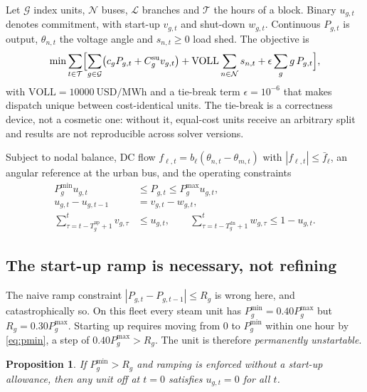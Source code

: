 \documentclass[11pt,a4paper]{article}
\theoremstyle{definition}
\theoremstyle{plain}
\newtheorem{proposition}[definition]{Proposition}
\theoremstyle{remark}
\newcommand{\VOLL}{\mathrm{VOLL}}
\begin{document}
Let $\mathcal{G}$ index units, $\mathcal{N}$ buses, $\mathcal{L}$ branches and
$\mathcal{T}$ the hours of a block. Binary $u_{g,t}$ denotes commitment, with
start-up $v_{g,t}$ and shut-down $w_{g,t}$. Continuous $P_{g,t}$ is output,
$\theta_{n,t}$ the voltage angle and $s_{n,t} \ge 0$ load shed. The objective is
\begin{equation}
\min \sum_{t\in\mathcal{T}}\Bigl[
  \sum_{g\in\mathcal{G}} \bigl(c_g P_{g,t} + C^{\mathrm{su}}_g v_{g,t}\bigr)
  + \VOLL \sum_{n\in\mathcal{N}} s_{n,t}
  + \epsilon \sum_{g} g\,P_{g,t}
\Bigr],
\label{eq:obj}
\end{equation}
with $\VOLL = \SI{10000}{\text{USD}\per\mega\watt\hour}$ and a tie-break term
$\epsilon = 10^{-6}$ that makes dispatch unique between cost-identical units.
The tie-break is a correctness device, not a cosmetic one: without it, equal-cost
units receive an arbitrary split and results are not reproducible across solver
versions.

Subject to nodal balance, DC flow $f_{\ell,t} = b_\ell(\theta_{n,t}-\theta_{m,t})$
with $|f_{\ell,t}| \le \bar f_\ell$, an angular reference at the urban bus, and
the operating constraints
\begin{align}
P^{\min}_g u_{g,t} &\le P_{g,t} \le P^{\max}_g u_{g,t}, \label{eq:pmin}\\
u_{g,t} - u_{g,t-1} &= v_{g,t} - w_{g,t}, \label{eq:logic}\\
\textstyle\sum_{\tau=t-T^{\mathrm{up}}_g+1}^{t} v_{g,\tau} &\le u_{g,t},
\qquad
\textstyle\sum_{\tau=t-T^{\mathrm{dn}}_g+1}^{t} w_{g,\tau} \le 1-u_{g,t}.
\label{eq:minupdn}
\end{align}

\subsection{The start-up ramp is necessary, not refining}
\label{sec:startup}

The naive ramp constraint $|P_{g,t}-P_{g,t-1}| \le R_g$ is wrong here, and
catastrophically so. On this fleet every steam unit has
$P^{\min}_g = 0.40 P^{\max}_g$ but $R_g = 0.30 P^{\max}_g$. Starting up requires
moving from $0$ to $P^{\min}_g$ within one hour by \eqref{eq:pmin}, a step of
$0.40P^{\max}_g > R_g$. The unit is therefore \emph{permanently unstartable}.

\begin{proposition}
If $P^{\min}_g > R_g$ and ramping is enforced without a start-up allowance, then
any unit off at $t=0$ satisfies $u_{g,t}=0$ for all $t$.
\end{proposition}
\end{document}
